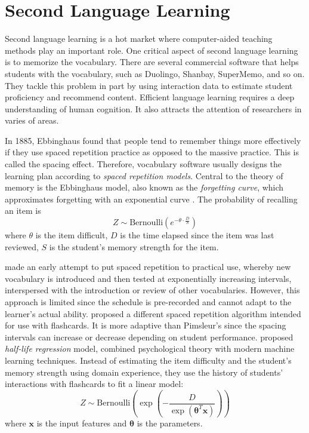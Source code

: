 \section{Second Language Learning}

    Second language learning is a hot market where computer-aided teaching methods play an important role.
    One critical aspect of second language learning is to memorize the vocabulary.
    There are several commercial software that helps students with the vocabulary,
    such as Duolingo\cite{duolingo}, Shanbay\cite{shanbay}, SuperMemo\cite{supermemo}, and so on.
    They tackle this problem in part by using interaction data to estimate student proficiency and recommend content.
    Efficient language learning requires a deep understanding of human cognition.
    It also attracts the attention of researchers in varies of areas.

    In 1885, Ebbinghaus found that people tend to remember things more effectively
    if they use spaced repetition practice as opposed to the massive practice. \cite{ebbinghaus2013memory}
    This is called the spacing effect.
    Therefore, vocabulary software usually designs the learning plan according to \emph{spaced repetition models}.
    Central to the theory of memory is the Ebbinghaus model, also known as the \emph{forgetting curve},
    which approximates forgetting with an exponential curve \cite{bliss1993synaptic}.
    The probability of recalling an item is \cite{reddy2016unbounded}
    \[ Z \sim \mathrm{Bernoulli}\left( e^{-\theta\cdot\frac{D}{S}} \right) \]
    where $\theta$ is the item difficult,
    $D$ is the time elapsed since the item was last reviewed,
    $S$ is the student's memory strength for the item.

    \textcite{pimsleur1967memory} made an early attempt to put spaced repetition to practical use,
    whereby new vocabulary is introduced and then tested at exponentially increasing intervals,
    interspersed with the introduction or review of other vocabularies.
    However, this approach is limited since the schedule is pre-recorded and cannot adapt to the learner's actual ability.
    \textcite{leitner1972so} proposed a different spaced repetition algorithm intended for use with flashcards.
    It is more adaptive than Pimsleur's
    since the spacing intervals can increase or decrease depending on student performance.
    \textcite{settles2016trainable} proposed \emph{half-life regression} model,
    combined psychological theory with modern machine learning techniques.
    Instead of estimating the item difficulty and the student's memory strength using domain experience,
    they use the history of students' interactions with flashcards to fit a linear model:
    \[ Z \sim \mathrm{Bernoulli}\left( \exp\left( -\frac{D}{\exp(\bm{\theta}^T\bm{x})} \right)\right) \]
    where $\bm{x}$ is the input features and $\bm{\theta}$ is the parameters.

